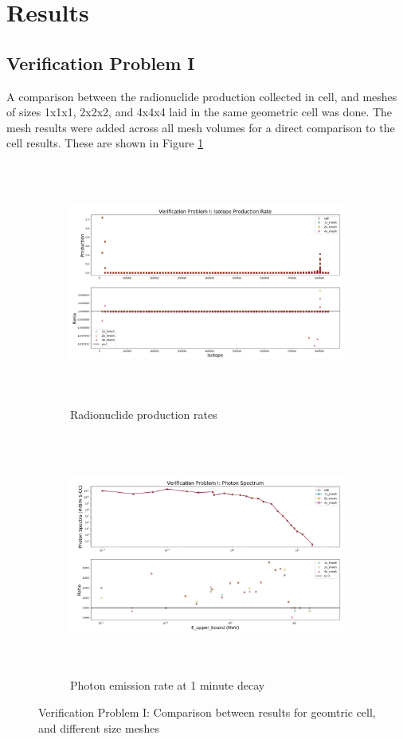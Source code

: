 \section{Results}
\subsection{Verification Problem I}
A comparison between the  radionuclide production collected in cell,
and meshes of sizes 1x1x1, 2x2x2, and 4x4x4 laid in the same geometric cell
was done. The mesh results were added across all mesh volumes for a direct
comparison to the cell results. These are shown in Figure \ref{fig:1prod_cell_2x_4x}
\begin{figure}[h!]
 \begin{centering}
 \centering
 \begin{subfigure}[b]{.8\textwidth}
 \includegraphics[width=0.99\linewidth,height=8cm]{../figs/toy_p1/prod_VPI_1x_2x_4x.png}
 \caption{Radionuclide production rates}
 \label{fig:1prod_cell_2x_4x}
 \end{subfigure}
 \hspace{0.05cm}
 \begin{subfigure}[b]{.8\textwidth}
 \centering
 \includegraphics[width=.99\linewidth,height=8cm]{../figs/toy_p1/spec_VPI_1x_2x_4x.png}
 \caption{Photon emission rate at 1 minute decay }
 \label{2prod_cell_2x}
 \end{subfigure}
 \caption{Verification Problem I: Comparison between results for geomtric cell, and different size meshes}
 \label{prod_cell_2x}
 \end{centering}
\end{figure}
